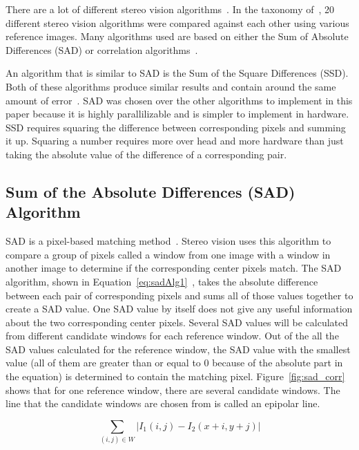 There are a lot of different stereo vision algorithms~\cite{taxonomy}. In the taxonomy of~\cite{taxonomy}, 20 different stereo vision algorithms were compared against each other using various reference images. Many algorithms used are based on either the Sum of Absolute Differences (SAD) or correlation algorithms~\cite{alteraStratixIVPaper}.

An algorithm that is similar to SAD is the Sum of the Square Differences (SSD). Both of these algorithms produce similar results and contain around the same amount of error~\cite{xilinxSpartan3ABoard}. SAD was chosen over the other algorithms to implement in this paper because it is highly parallilizable and is simpler to implement in hardware. SSD requires squaring the difference between corresponding pixels and summing it up. Squaring a number requires more over head and more hardware than just taking the absolute value of the difference of a corresponding pair.

\subsection{Sum of the Absolute Differences (SAD) Algorithm}

SAD is a pixel-based matching method~\cite{alteraStratixIVPaper}. Stereo vision uses this algorithm to compare a group of pixels called a window from one image with a window in another image to determine if the corresponding center pixels match. The SAD algorithm, shown in Equation~\ref{eq:sadAlg1}~\cite{alteraStratixIVPaper}, takes the absolute difference between each pair of corresponding pixels and sums all of those values together to create a SAD value. One SAD value by itself does not give any useful information about the two corresponding center pixels. Several SAD values will be calculated from different candidate windows for each reference window. Out of the all the SAD values calculated for the reference window, the SAD value with the smallest value (all of them are greater than or equal to 0 because of the absolute part in the equation) is determined to contain the matching pixel. Figure~\ref{fig:sad_corr} shows that for one reference window, there are several candidate windows. The line that the candidate windows are chosen from is called an epipolar line.

\begin{equation}
	\sum\limits_{(i,j)\in W}\left| I_{1}(i,j)-I_{2}(x+i,y+j) \right|
	\label{eq:sadAlg1}
\end{equation}

